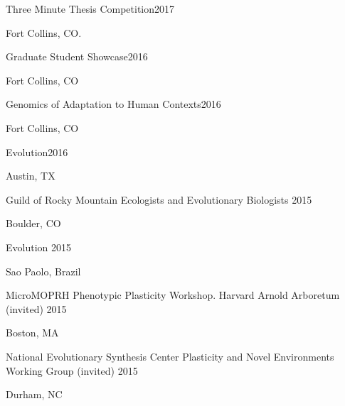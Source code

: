 \documentclass[12pt,english]{article}
\begin{document}
\hspace*{1.0em}Three Minute Thesis Competition\hfill 2017 \par
\hspace*{2.0em}Fort Collins, CO. \par\vspace{0.5ex}

\hspace*{1.0em}Graduate Student Showcase\hfill 2016 \par
\hspace*{2.0em}Fort Collins, CO \par\vspace{0.5ex}

\hspace*{1.0em}Genomics of Adaptation to Human Contexts\hfill 2016 \par
\hspace*{2.0em}Fort Collins, CO \par\vspace{0.5ex}

\hspace*{1.0em}Evolution\hfill 2016 \par
\hspace*{2.0em}Austin, TX \par\vspace{0.5ex}

\hspace*{1.0em}Guild of Rocky Mountain Ecologists and Evolutionary Biologists \hfill 2015 \par
\hspace*{2.0em}Boulder, CO \par\vspace{0.5ex}

\hspace*{1.0em}Evolution \hfill 2015 \par
\hspace*{2.0em}Sao Paolo, Brazil \par\vspace{0.5ex}

\hspace*{1.0em}MicroMOPRH Phenotypic Plasticity Workshop. Harvard Arnold Arboretum (invited) \hfill 2015 \par
\hspace*{2.0em}Boston, MA  \par\vspace{0.5ex}

\hspace*{1.0em}National Evolutionary Synthesis Center Plasticity and Novel Environments Working Group (invited) \hfill 2015 \par
\hspace*{2.0em}Durham, NC \par\vspace{0.5ex}
\end{document}
